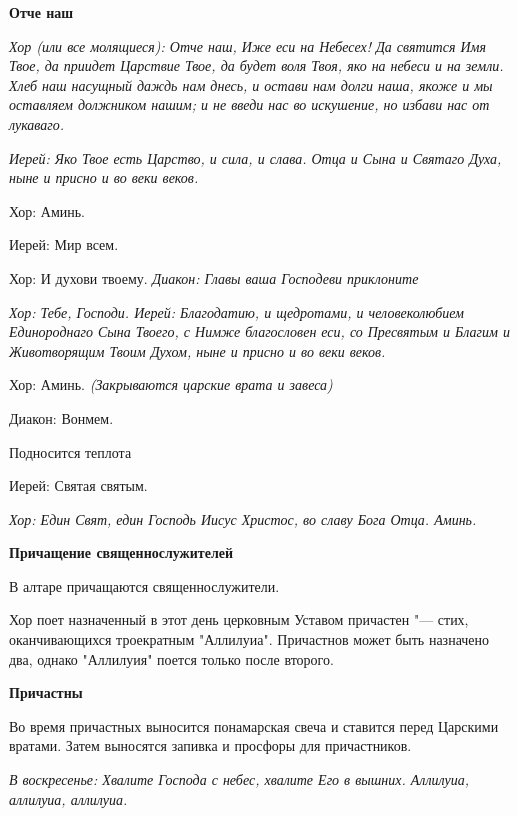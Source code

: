 \medskip


 \bfseries  Отче наш \normalfont{}


\itshape  Хор (или все молящиеся):\normalfont{} Отче наш, Иже еси на Небесех! Да святится Имя Твое, да приидет Царствие Твое, да будет воля Твоя, яко на небеси и на земли. Хлеб наш насущный даждь нам днесь, и остави нам долги наша, якоже и мы оставляем должником нашим; и не введи нас во искушение, но избави нас от лукаваго. 


\itshape  Иерей:\normalfont{} Яко Твое есть Царство, и сила, и слава. Отца и Сына и Святаго Духа, ныне и присно и во веки веков. \itshape 


  Хор:\normalfont{} Аминь. \itshape 


  Иерей:\normalfont{} Мир всем. \itshape 


  Хор:\normalfont{} И духови твоему. \itshape  Диакон:\normalfont{} Главы ваша Господеви приклоните


\itshape Хор:\normalfont{} Тебе, Господи. \itshape  Иерей:\normalfont{} Благодатию, и щедротами, и человеколюбием Единороднаго Сына Твоего, с Нимже благословен еси, со Пресвятым и Благим и Животворящим Твоим Духом, ныне и присно и во веки веков. \itshape 


  Хор:\normalfont{} Аминь. \itshape  (Закрываются царские врата и завеса)


  Диакон:\normalfont{} Вонмем. \itshape 


  Подносится теплот\normalfont{}а \itshape 


  Иерей:\normalfont{} Святая святым. 


\itshape  Хор:\normalfont{} Един Свят, един Господь Иисус Христос, во славу Бога Отца. Аминь. 


\medskip


\bfseries  Причащение священнослужителей \normalfont{}


  В алтаре причащаются священнослужители. 


Хор поет назначенный в этот день церковным Уставом причастен "--- стих, оканчивающихся троекратным "Аллилуиа". Причастнов может быть назначено два, однако "Аллилуия" поется только после второго. 


\medskip


\bfseries  Причастны \normalfont{}


      Во время причастных выносится понамарская свеча и ставится перед Царскими вратами. Затем выносятся запивка и просфоры для причастников.


\itshape  В воскресенье:\normalfont{} Хвалите Господа с небес, хвалите Его в вышних. Аллилуиа, аллилуиа, аллилуиа. 


